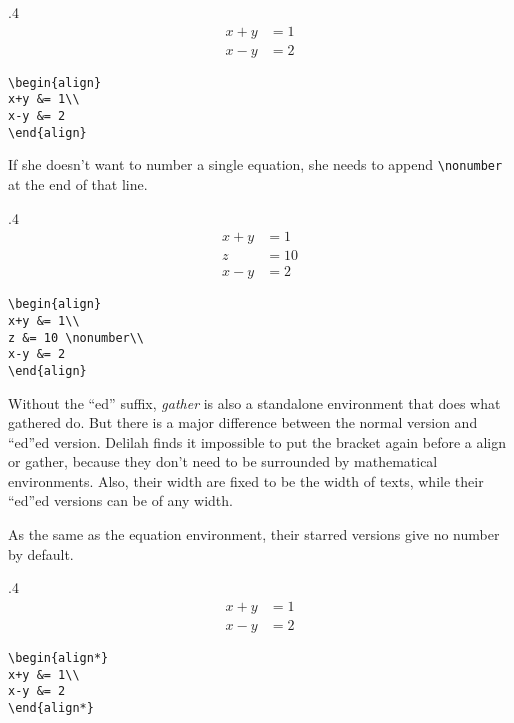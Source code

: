 \begin{miniexammar}{.4\textandmarginlen}{
\begin{align}
x+y &= 1\\
x-y &= 2
\end{align}
}
\begin{lstlisting}
\begin{align}
x+y &= 1\\
x-y &= 2
\end{align}
\end{lstlisting}
\end{miniexammar}

If she doesn't want to number a single equation, she needs to append \verb=\nonumber= at the end of that line.
\begin{miniexammar}{.4\textandmarginlen}{
\begin{align}
x+y &= 1\\
z&=10 \nonumber\\
x-y &= 2
\end{align}
}
\begin{lstlisting}
\begin{align}
x+y &= 1\\
z &= 10 \nonumber\\
x-y &= 2
\end{align}
\end{lstlisting}
\end{miniexammar}

Without the ``ed'' suffix, \emph{gather} is also a standalone environment that does what gathered do. But there is a major difference between the normal version and ``ed''ed version. Delilah finds it impossible to put the bracket again before a align or gather, because they don't need to be surrounded by mathematical environments. Also, their width are fixed to be the width of texts, while their ``ed''ed versions can be of any width.

As the same as the equation environment, their starred versions give no number by default.
\begin{miniexammar}{.4\textandmarginlen}{
\begin{align*}
x+y &= 1\\
x-y &= 2
\end{align*}
}
\begin{lstlisting}
\begin{align*}
x+y &= 1\\
x-y &= 2
\end{align*}
\end{lstlisting}
\end{miniexammar}

